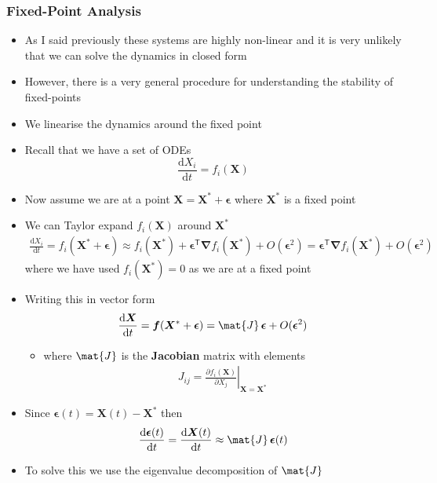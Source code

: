\documentclass[11pt]{article}
\newcommand{\tr}{\textsf{T}}
\newcommand{\grad}{\bm{\nabla}}
\newcommand{\dd}{\mathrm{d}}
\begin{document}
\subsubsection{Fixed-Point Analysis}
\label{sec:orga304e1a}
\begin{itemize}
\item As I said previously these systems are highly non-linear and it
is very unlikely that we can solve the dynamics in closed form
\item However, there is a very general procedure for understanding the
stability of fixed-points
\item We linearise the dynamics around the fixed point
\item Recall that we have a set of ODEs
\[ \frac{\dd X_i}{\dd t} = f_i(\bm{X}) \]
\item Now assume we are at a point \(\bm{X}=\bm{X}^{*}+\bm{\epsilon}\) where
\(\bm{X}^{*}\) is a fixed point
\item We can Taylor expand \(f_i(\bm{X})\) around \(\bm{X}^{*}\)
\begin{align*}
 \frac{\dd X_i}{\dd t} = f_i(\bm{X}^*+\bm{\epsilon})
 \approx f_i(\bm{X}^*) + \bm{\epsilon}^\tr \grad f_i(\bm{X}^*) + O(\bm{\epsilon}^2)
 = \bm{\epsilon}^\tr \grad f_i(\bm{X}^*) + O(\bm{\epsilon}^2)
\end{align*}
where we have used \(f_i(\bm{X}^*)=0\) as we are at a fixed point
\item Writing this in vector form
\begin{align*}
\frac{\dd \bm{X}}{\dd t} = \bm{f}(\bm{X}^*+\bm{\epsilon})
=  \mat{J}\, \bm{\epsilon} + O(\bm{\epsilon}^2)
 \end{align*}
\begin{itemize}
\item where \(\mat{J}\) is the \textbf{Jacobian} matrix with elements
\begin{align*}
  J_{ij} = \left. \frac{\partial f_i(\bm{X})}{\partial X_j}\right|_{\bm{X}=\bm{X}^*}
\end{align*}
\end{itemize}
\item Since \(\bm{\epsilon}(t) = \bm{X}(t) - \bm{X}^*\) then
\begin{align*}
  \frac{\dd \bm{\epsilon}(t)}{\dd t} = \frac{\dd \bm{X}(t)}{\dd t}
  \approx \mat{J}\, \bm{\epsilon}(t)
\end{align*}
\item To solve this we use the eigenvalue decomposition of \(\mat{J}\)
     \begin{align*}

\end{align*}
\end{itemize}
\end{document}
